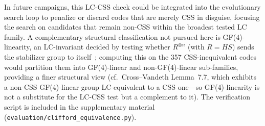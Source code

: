 \documentclass[aps,prxquantum,twocolumn,superscriptaddress,nofootinbib]{revtex4-2}
\begin{document}
In future campaigns, this LC-CSS check could be integrated into the evolutionary search loop to penalize or discard codes that are merely CSS in disguise, focusing the search on candidates that remain non-CSS within the broadest tested LC family.
A complementary structural classification not pursued here is GF(4)-linearity, an LC-invariant decided by testing whether $R^{\otimes n}$ (with $R = HS$) sends the stabilizer group to itself~\cite[Lemma~7.5, Cor.~7.6]{cross2025small}; computing this on the 357 CSS-inequivalent codes would partition them into GF(4)-linear and non-GF(4)-linear sub-families, providing a finer structural view (cf.~Cross--Vandeth Lemma~7.7, which exhibits a non-CSS GF(4)-linear group LC-equivalent to a CSS one---so GF(4)-linearity is not a substitute for the LC-CSS test but a complement to it).
The verification script is included in the supplementary material (\texttt{evaluation/clifford\_equivalence.py}).


\end{document}
